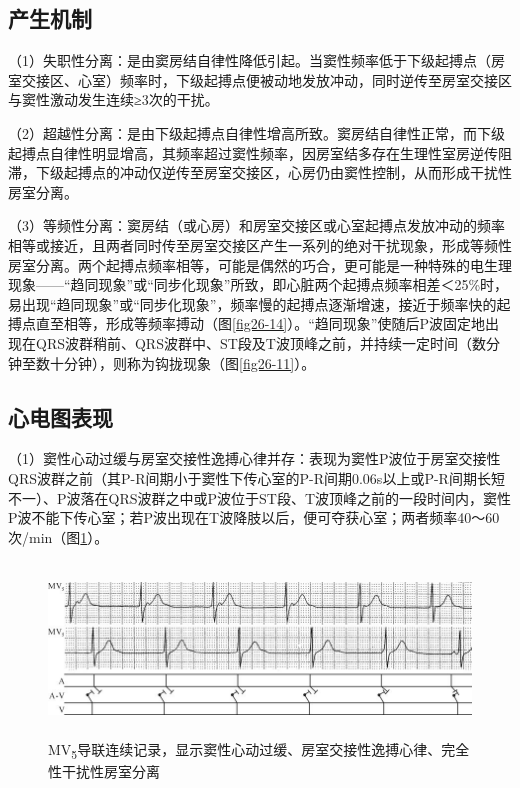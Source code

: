 \protect\hypertarget{text00033.htmlux5cux23subid404}{}{}

\subsection{产生机制}

（1）失职性分离：是由窦房结自律性降低引起。当窦性频率低于下级起搏点（房室交接区、心室）频率时，下级起搏点便被动地发放冲动，同时逆传至房室交接区与窦性激动发生连续≥3次的干扰。

（2）超越性分离：是由下级起搏点自律性增高所致。窦房结自律性正常，而下级起搏点自律性明显增高，其频率超过窦性频率，因房室结多存在生理性室房逆传阻滞，下级起搏点的冲动仅逆传至房室交接区，心房仍由窦性控制，从而形成干扰性房室分离。

（3）等频性分离：窦房结（或心房）和房室交接区或心室起搏点发放冲动的频率相等或接近，且两者同时传至房室交接区产生一系列的绝对干扰现象，形成等频性房室分离。两个起搏点频率相等，可能是偶然的巧合，更可能是一种特殊的电生理现象------“趋同现象”或“同步化现象”所致，即心脏两个起搏点频率相差＜25\%时，易出现“趋同现象”或“同步化现象”，频率慢的起搏点逐渐增速，接近于频率快的起搏点直至相等，形成等频率搏动（图\ref{fig26-14}）。“趋同现象”使随后P波固定地出现在QRS波群稍前、QRS波群中、ST段及T波顶峰之前，并持续一定时间（数分钟至数十分钟），则称为钩拢现象（图\ref{fig26-11}）。

\protect\hypertarget{text00033.htmlux5cux23subid405}{}{}

\subsection{心电图表现}

（1）窦性心动过缓与房室交接性逸搏心律并存：表现为窦性P波位于房室交接性QRS波群之前（其P-R间期小于窦性下传心室的P-R间期0.06s以上或P-R间期长短不一）、P波落在QRS波群之中或P波位于ST段、T波顶峰之前的一段时间内，窦性P波不能下传心室；若P波出现在T波降肢以后，便可夺获心室；两者频率40～60次/min（图\ref{fig26-10}）。

\begin{figure}[!htbp]
 \centering
 \includegraphics[width=5.80208in,height=1.8125in]{./images/Image00451.jpg}
 \captionsetup{justification=centering}
 \caption{MV\textsubscript{5}导联连续记录，显示窦性心动过缓、房室交接性逸搏心律、完全性干扰性房室分离}
 \label{fig26-10}
  \end{figure} 


